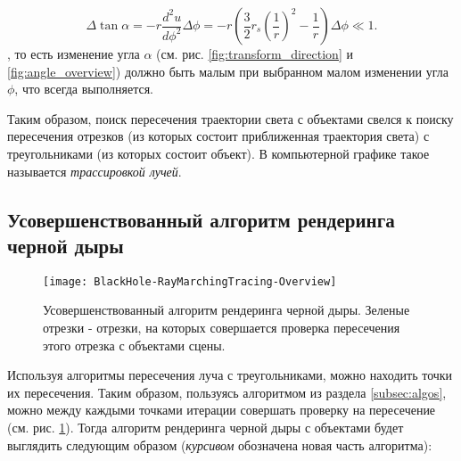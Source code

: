 \begin{equation}
    \Delta\tan{\alpha} = -r\frac{d^2u}{d\phi^2}\Delta\phi = -r\left( \frac{3}{2}r_s\left(\frac{1}{r}\right)^2 - \frac{1}{r} \right)\Delta\phi \ll 1.
\end{equation}
, то есть изменение угла $\alpha$ (см. рис. \ref{fig:transform_direction} и \ref{fig:angle_overview}) должно быть малым при выбранном малом изменении угла $\phi$, что всегда выполняется.

Таким образом, поиск пересечения траектории света с объектами свелся к поиску пересечения отрезков (из которых состоит приближенная траектория света) с треугольниками (из которых состоит объект). В компьютерной графике такое называется \textit{трассировкой лучей}.

\subsection{Усовершенствованный алгоритм рендеринга черной дыры}
\label{subsec:new_algos}

\begin{figure}[h]
    \centering
    \texttt{[image: BlackHole-RayMarchingTracing-Overview]}
    \caption{Усовершенствованный алгоритм рендеринга черной дыры. Зеленые отрезки - отрезки, на которых совершается проверка пересечения этого отрезка с объектами сцены.}
    \label{fig:blackhole_raymarchingtracing}
\end{figure}

Используя алгоритмы пересечения луча с треугольниками, можно находить точки их пересечения. Таким образом, пользуясь алгоритмом из раздела \ref{subsec:algos}, можно между каждыми точками итерации совершать проверку на пересечение (см. рис. \ref{fig:blackhole_raymarchingtracing}). Тогда алгоритм рендеринга черной дыры с объектами будет выглядить следующим образом (\textit{курсивом} обозначена новая часть алгоритма):

